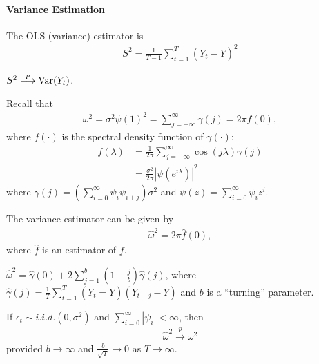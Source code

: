 \documentclass[11pt]{elegantbook}
\begin{document}
\paragraph*{Variance Estimation}
The OLS (variance) estimator is
\begin{equation}
    \begin{aligned}
        S^2=\frac{1}{T-1}\sum_{t=1}^T\left(Y_t-\bar{Y}\right)^2
    \end{aligned}
    \nonumber
\end{equation}
\begin{claim}
    $S^2 \stackrel{p}{\longrightarrow} \textnormal{Var}(Y_t)$.
\end{claim}
Recall that
\begin{equation}
    \begin{aligned}
        \omega^2=\sigma^2\psi(1)^2=\sum_{j=-\infty}^\infty\gamma(j)=2\pi f(0),
    \end{aligned}
    \nonumber
\end{equation}
where $f(\cdot)$ is the spectral density function of $\gamma(\cdot)$:
\begin{equation}
    \begin{aligned}
        f(\lambda)&=\frac{1}{2\pi}\sum_{j=-\infty}^\infty \cos\left(j\lambda\right)\gamma(j)\\
        &=\frac{\sigma^2}{2\pi}|\psi(e^{i\lambda})|^2
    \end{aligned}
    \nonumber
\end{equation}
where $\gamma(j)=(\sum_{i=0}^\infty \psi_i\psi_{i+j})\sigma^2$ and $\psi(z)=\sum_{i=0}^\infty \psi_iz^i$.

The variance estimator can be given by
\begin{equation}
    \begin{aligned}
        \hat{\omega}^2=2\pi\hat{f}(0),
    \end{aligned}
    \nonumber
\end{equation}
where $\hat{f}$ is an estimator of $f$.
\begin{example}
    $\hat{\omega}^2=\hat{\gamma}(0)+2\sum_{j=1}^b\left(1-\frac{j}{b}\right)\hat{\gamma}(j)$, where $\hat{\gamma}(j)=\frac{1}{T}\sum_{t=1}^T(Y_t=\bar{Y})\left(Y_{t-j}-\bar{Y}\right)$ and $b$ is a ``turning'' parameter.
\end{example}
\begin{remark}
    If $\epsilon_t\sim{i.i.d.}(0,\sigma^2)$ and $\sum_{i=0}^\infty |\psi_i|<\infty$, then
    \begin{equation}
        \begin{aligned}
            \hat{\omega}^2 \stackrel{p}{\longrightarrow} \omega^2
        \end{aligned}
        \nonumber
    \end{equation}
    provided $b \rightarrow \infty$ and $\frac{b}{\sqrt{T}} \rightarrow 0$ as $T \rightarrow \infty$.
\end{remark}
\end{document}
